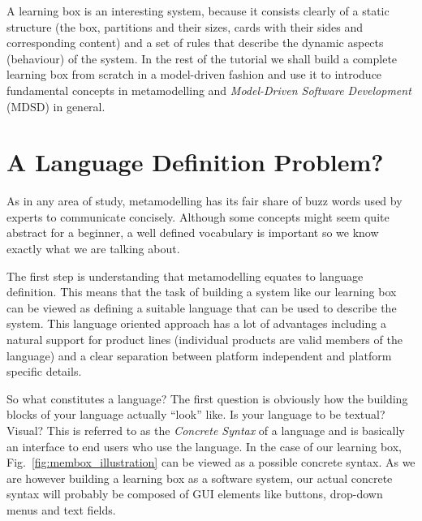 A learning box is an interesting system, because it consists clearly of a static structure (the box, partitions and their sizes, cards with their sides and corresponding content) and a set of rules that describe the dynamic aspects 
(behaviour) of the system.  
In the rest of the tutorial we shall build a complete learning box from scratch in a model-driven fashion and use it to introduce fundamental concepts in metamodelling and \emph{Model-Driven Software Development} (MDSD) in general.  

\section{A Language Definition Problem?}

As in any area of study, metamodelling has its fair share of buzz words used by experts to communicate concisely.  Although some concepts might seem quite abstract for a beginner, a well defined vocabulary is important so we know
exactly what we are talking about.   

The first step is understanding that metamodelling equates to language definition.
This means that the task of building a system like our learning box can be viewed as defining a suitable language that can be used to describe the system.
This language oriented approach has a lot of advantages including a natural support for product lines (individual products are valid members of the language) and a clear separation between platform independent and platform specific details.      

So what constitutes a language?  The first question is obviously  how the building blocks of your language actually ``look'' like.  
Is your language to be textual?  Visual?  This is referred to as the \emph{Concrete Syntax} of a language and is basically an interface to end users who use the language.  
In the case of our learning box, Fig.~\ref{fig:membox_illustration} can be viewed as a possible concrete syntax.
As we are however building a learning box as a software system, our actual concrete syntax  will probably be composed of GUI elements like buttons, drop-down menus and text fields.   

